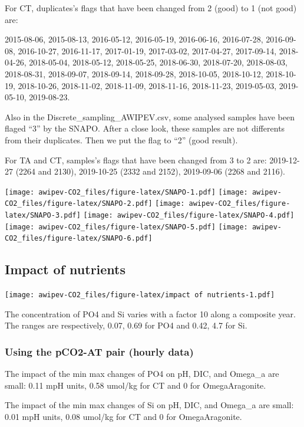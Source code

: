 \documentclass[
]{article}
\begin{document}
For CT, duplicates's flags that have been changed from 2 (good) to 1
(not good) are:

2015-08-06, 2015-08-13, 2016-05-12, 2016-05-19, 2016-06-16, 2016-07-28,
2016-09-08, 2016-10-27, 2016-11-17, 2017-01-19, 2017-03-02, 2017-04-27,
2017-09-14, 2018-04-26, 2018-05-04, 2018-05-12, 2018-05-25, 2018-06-30,
2018-07-20, 2018-08-03, 2018-08-31, 2018-09-07, 2018-09-14, 2018-09-28,
2018-10-05, 2018-10-12, 2018-10-19, 2018-10-26, 2018-11-02, 2018-11-09,
2018-11-16, 2018-11-23, 2019-05-03, 2019-05-10, 2019-08-23.

Also in the Discrete\_sampling\_AWIPEV.csv, some analysed samples have
been flaged ``3'' by the SNAPO. After a close look, these samples are
not differents from their duplicates. Then we put the flag to ``2''
(good result).

For TA and CT, samples's flags that have been changed from 3 to 2 are:
2019-12-27 (2264 and 2130), 2019-10-25 (2332 and 2152), 2019-09-06 (2268
and 2116).

\texttt{[image: awipev-CO2\_files/figure-latex/SNAPO-1.pdf]}
\texttt{[image: awipev-CO2\_files/figure-latex/SNAPO-2.pdf]}
\texttt{[image: awipev-CO2\_files/figure-latex/SNAPO-3.pdf]}
\texttt{[image: awipev-CO2\_files/figure-latex/SNAPO-4.pdf]}
\texttt{[image: awipev-CO2\_files/figure-latex/SNAPO-5.pdf]}
\texttt{[image: awipev-CO2\_files/figure-latex/SNAPO-6.pdf]}

\hypertarget{impact-of-nutrients}{%
\subsection{Impact of nutrients}\label{impact-of-nutrients}}

\texttt{[image: awipev-CO2\_files/figure-latex/impact of nutrients-1.pdf]}

The concentration of PO4 and Si varies with a factor 10 along a
composite year. The ranges are respectively, 0.07, 0.69 for PO4 and
0.42, 4.7 for Si.

\hypertarget{using-the-pco2-at-pair-hourly-data}{%
\subsubsection{Using the pCO2-AT pair (hourly
data)}\label{using-the-pco2-at-pair-hourly-data}}

The impact of the min max changes of PO4 on pH, DIC, and Omega\_a are
small: 0.11 mpH units, 0.58 umol/kg for CT and 0 for OmegaAragonite.

The impact of the min max changes of Si on pH, DIC, and Omega\_a are
small: 0.01 mpH units, 0.08 umol/kg for CT and 0 for OmegaAragonite.
\end{document}
